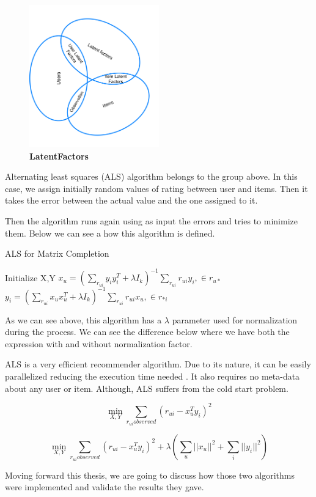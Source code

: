 \begin{figure}[h]
	\centering
	\includegraphics[width=0.5\textwidth]{../images/LatentFactors.png}
	\caption{\bfseries LatentFactors}
	\label{LatentFactors}
\end{figure}


Alternating least squares (ALS) algorithm belongs to the group above. In this case, we assign initially random values of rating between user and items. Then it takes the error between the actual value and the one assigned to it. 

Then the algorithm runs again using as input the errors and tries to minimize them. Below we can see a how this algorithm is defined. \\

\begin{algorithm}
	\caption{ALS for Matrix Completion}\label{ALS}
	\begin{algorithmic}[1]
		\State Initialize X,Y
		\Repeat
		\State $x_{u} = (\sum_{r_{ui}}y_{i}y_{i}^{T} + \lambda I_k)^{-1} \sum_{r_{ui}}r_{ui}y_{i} ,\in r_{u*}$
		\EndFor
		\State $y_{i} = (\sum_{r_{ui}}x_{u}x_{u}^{T} + \lambda I_k)^{-1} \sum_{r_{ui}}r_{ui}x_{u} ,\in r_{*i}$
		\EndFor
	\end{algorithmic}
\end{algorithm}

As we can see above, this algorithm has a $\lambda$ parameter used for normalization during the process. We can see the difference below where we have both the expression with and without normalization factor.

ALS is a very efficient recommender algorithm. Due to its nature, it can be easily parallelized reducing the execution time needed \cite{DistributedAlgorithmsAndOptimization:4}. It also requires no meta-data about any user or item. Although, ALS suffers from the cold start problem.

\begin{equation}
\min_{X,Y} \sum_{r_{ui}observed}(r_{ui}-x_{u}^{T}y_{i})^{2}
\end{equation}

\begin{equation}
\min_{X,Y} \sum_{r_{ui}observed}(r_{ui}-x_{u}^{T}y_{i})^{2} + \lambda(\sum_{u}||x_{u}||^2 + \sum_{i}||y_{i}||^2)
\end{equation}

Moving forward this thesis, we are going to discuss how those two algorithms were implemented and validate the results they gave.